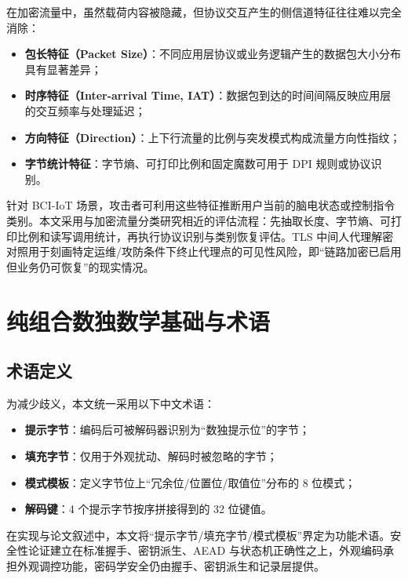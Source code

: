 在加密流量中，虽然载荷内容被隐藏，但协议交互产生的侧信道特征往往难以完全消除：
\begin{itemize}
  \item \textbf{包长特征（Packet Size）}：不同应用层协议或业务逻辑产生的数据包大小分布具有显著差异；
  \item \textbf{时序特征（Inter-arrival Time, IAT）}：数据包到达的时间间隔反映应用层的交互频率与处理延迟；
  \item \textbf{方向特征（Direction）}：上下行流量的比例与突发模式构成流量方向性指纹；
  \item \textbf{字节统计特征}：字节熵、可打印比例和固定魔数可用于 DPI 规则或协议识别。
\end{itemize}

针对 BCI-IoT 场景，攻击者可利用这些特征推断用户当前的脑电状态或控制指令类别。本文采用与加密流量分类研究相近的评估流程：先抽取长度、字节熵、可打印比例和读写调用统计，再执行协议识别与类别恢复评估。TLS 中间人代理解密对照用于刻画特定运维/攻防条件下终止代理点的可见性风险，即“链路加密已启用但业务仍可恢复”的现实情况\cite{wilkens2021passivetls}。

\section{纯组合数独数学基础与术语}
\subsection{术语定义}
为减少歧义，本文统一采用以下中文术语：
\begin{itemize}
  \item \textbf{提示字节}：编码后可被解码器识别为“数独提示位”的字节；
  \item \textbf{填充字节}：仅用于外观扰动、解码时被忽略的字节；
  \item \textbf{模式模板}：定义字节位上“冗余位/位置位/取值位”分布的 8 位模式；
  \item \textbf{解码键}：4 个提示字节按序拼接得到的 32 位键值。
\end{itemize}

在实现与论文叙述中，本文将“提示字节/填充字节/模式模板”界定为功能术语。安全性论证建立在标准握手、密钥派生、AEAD 与状态机正确性之上，外观编码承担外观调控功能，密码学安全仍由握手、密钥派生和记录层提供。

